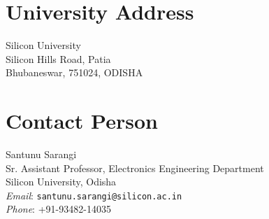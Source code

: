 \documentclass[12pt]{article}
\begin{document}
\section{University Address}
Silicon University \\
Silicon Hills Road, Patia \\
Bhubaneswar, 751024, ODISHA

\section{Contact Person}

Santunu Sarangi \\
Sr. Assistant Professor, Electronics Engineering Department \\
Silicon University, Odisha \\
\textit{Email}: \texttt{santunu.sarangi@silicon.ac.in} \\
\textit{Phone}: +91-93482-14035 \\



\end{document}
